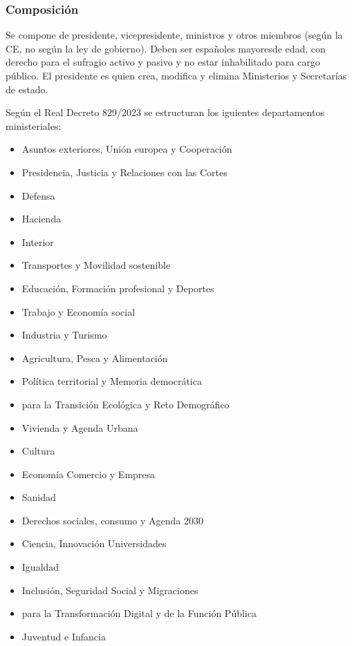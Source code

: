     \subsubsection{Composición}
        Se compone de presidente, vicepresidente, ministros y otros miembros (según la CE, no según la ley de gobierno). Deben ser españoles mayoresde edad, con derecho para el sufragio activo y pasivo y no estar inhabilitado para cargo público. El presidente es quien crea, modifica y elimina Ministerios y Secretarías de estado.

        Según el Real Decreto 829/2023 se estructuran los iguientes departamentos ministeriales:
        \begin{itemize}
            \item Asuntos exteriores, Unión europea y Cooperación
            \item Presidencia, Justicia y Relaciones con las Cortes
            \item Defensa
            \item Hacienda
            \item Interior
            \item Transportes y Movilidad sostenible
            \item Educación, Formación profesional y Deportes
            \item Trabajo y Economía social
            \item Industria y Turismo
            \item Agricultura, Pesca y Alimentación
            \item Política territorial y Memoria democrática
            \item para la Transición Ecológica y Reto Demográfico
            \item Vivienda y Agenda Urbana
            \item Cultura
            \item Economía Comercio y Empresa
            \item Sanidad
            \item Derechos sociales, consumo y Agenda 2030
            \item Ciencia, Innovación  Universidades
            \item Igualdad
            \item Inclusión, Seguridad Social y Migraciones
            \item para la Transformación Digital y de la Función Pública
            \item Juventud e Infancia
        \end{itemize}

